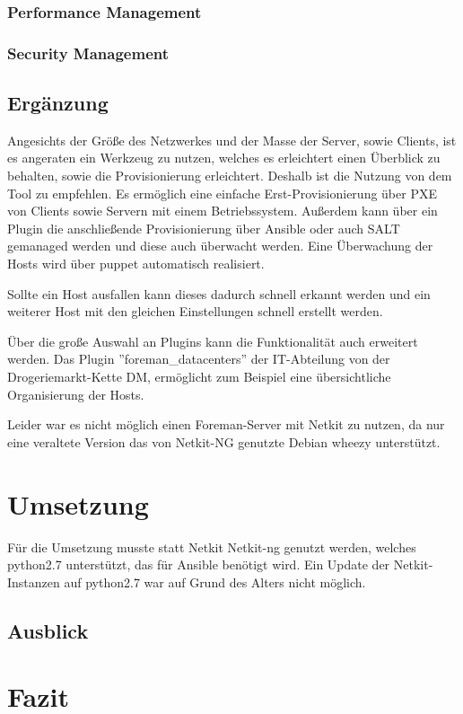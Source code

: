 \documentclass[a4paper]{article}
\begin{document}
\subsubsection{Performance Management}

\subsubsection{Security Management}

\subsection{Ergänzung}
Angesichts der Größe des Netzwerkes und der Masse der Server, sowie Clients, ist es angeraten ein Werkzeug zu nutzen, welches es erleichtert einen Überblick zu behalten, sowie die Provisionierung erleichtert. Deshalb ist die Nutzung von dem Tool  zu empfehlen. Es ermöglich eine einfache Erst-Provisionierung über PXE von Clients sowie Servern mit einem Betriebssystem. Außerdem kann über ein Plugin die anschließende Provisionierung über Ansible oder auch SALT gemanaged werden und diese auch überwacht werden. Eine Überwachung der Hosts wird über puppet automatisch realisiert.

Sollte ein Host ausfallen kann dieses dadurch schnell erkannt werden und ein weiterer Host mit den gleichen Einstellungen schnell erstellt werden.

Über die große Auswahl an Plugins kann die Funktionalität auch erweitert werden. Das Plugin ''foreman\_datacenters'' der IT-Abteilung von der Drogeriemarkt-Kette DM, ermöglicht zum Beispiel eine übersichtliche Organisierung der Hosts.

Leider war es nicht möglich einen Foreman-Server mit Netkit zu nutzen, da nur eine veraltete Version das von Netkit-NG genutzte Debian wheezy unterstützt.

\section{Umsetzung}

Für die Umsetzung musste statt Netkit Netkit-ng genutzt werden, welches python2.7 unterstützt, das für Ansible benötigt wird. Ein Update der Netkit-Instanzen auf python2.7 war auf Grund des Alters nicht möglich.
\subsection{Ausblick}

\section{Fazit}
\end{document}
